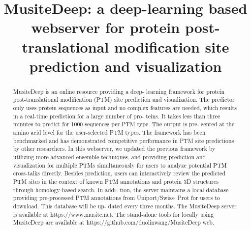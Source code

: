 \title{MusiteDeep: a deep-learning based webserver for protein post-translational modification site prediction and visualization}

\maketitle

\begin{abstract}
MusiteDeep is an online resource providing a deep- learning framework for protein post-translational modiﬁcation (PTM) site prediction and visualization. The predictor only uses protein sequences as input and no complex features are needed, which results in a real-time prediction for a large number of pro- teins. It takes less than three minutes to predict for 1000 sequences per PTM type. The output is pre- sented at the amino acid level for the user-selected PTM types. The framework has been benchmarked and has demonstrated competitive performance in PTM site predictions by other researchers. In this webserver, we updated the previous framework by utilizing more advanced ensemble techniques, and providing prediction and visualization for multiple PTMs simultaneously for users to analyze potential PTM cross-talks directly. Besides prediction, users can interactively review the predicted PTM sites in the context of known PTM annotations and protein 3D structures through homology-based search. In addi- tion, the server maintains a local database providing pre-processed PTM annotations from Uniport/Swiss- Prot for users to download. This database will be up- dated every three months. The MusiteDeep server is available at https://www.musite.net. The stand-alone tools for locally using MusiteDeep are available at https://github.com/duolinwang/MusiteDeep web.
\end{abstract}

